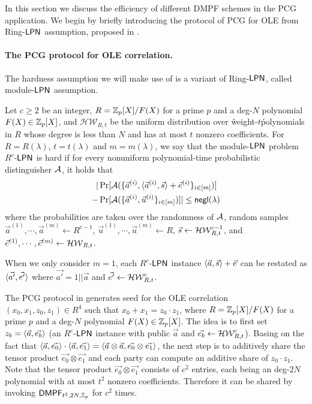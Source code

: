 In this section we discuss the efficiency of different DMPF schemes in the PCG application. We begin by briefly introducing the protocol of PCG for OLE from Ring-${\sf LPN}$ assumption, proposed in \cite{cryptoeprint:2022/1035}. 

\paragraph{The PCG protocol for OLE correlation.}The hardness assumption we will make use of is a variant of Ring-${\sf LPN}$, called module-${\sf LPN}$ assumption. 
\begin{definition}\label{def:module-LPN}
    Let $c\ge 2$ be an integer, $R = \mathbb{Z}_p[X]/F(X)$ for a prime $p$ and a deg-$N$ polynomial $F(X)\in \mathbb{Z}_p[X]$, and $\mathcal{HW}_{R,t}$ be the uniform distribution over \`weight-$t$\' polynomials in $R$ whose degree is less than $N$ and has at most $t$ nonzero coefficients. 
     For $R=R(\lambda)$, $t=t(\lambda)$ and $m=m(\lambda)$, we say that the module-${\sf LPN}$ problem $R^c$-${\sf LPN}$ is hard if for every nonuniform polynomial-time probabilistic distinguisher $\mathcal{A}$, it holds that 
    \begin{align*}
        |&\Pr[\mathcal{A}(\{\vec{a}^{(i)}, \langle \vec{a}^{(i)}, \vec{s} \rangle+\vec{e}^{(i)}\}_{i\in [m]})] \\
        -&\Pr[\mathcal{A}(\{\vec{a}^{(i)},\vec{u}^{(i)}\}_{i\in [m]})]| \le \mathsf{negl}(\lambda)
    \end{align*}
    where the probabilities are taken over the randomness of $\mathcal{A}$, random samples $\vec{a}^{(1)},\cdots, \vec{a}^{(m)}\leftarrow R^{c-1}$, $\vec{u}^{(1)},\cdots, \vec{u}^{(m)}\leftarrow R$, $\vec{s}\leftarrow \mathcal{HW}_{R,t}^{c-1}$, and $\vec{e}^{(1)},\cdots, \vec{e}^{(m)}\leftarrow \mathcal{HW}_{R,t}$. 

    When we only consider $m=1$, each $R^c$-${\sf LPN}$ instance $ \langle \vec{a}, \vec{s} \rangle+\vec{e}$ can be restated as $\langle \vec{a'}, \vec{e'} \rangle$ where $\vec{a'}=1||\vec{a}$ and $\vec{e'}\leftarrow \mathcal{HW}_{R,t}^c$. 
\end{definition}

The PCG protocol in \cite{cryptoeprint:2022/1035} generates seed for the OLE correlation $(x_0,x_1,z_0,z_1)\in R^4$ such that $x_0+x_1 = z_0\cdot z_1$, where $R = \mathbb{Z}_p[X]/F(X)$ for a prime $p$ and a deg-$N$ polynomial $F(X)\in \mathbb{Z}_p[X]$. The idea is to first set $z_b = \langle \vec{a}, \vec{e_b} \rangle$ (an $R^c$-${\sf LPN}$ instance with public $\vec{a}$ and $\vec{e_b}\leftarrow \mathcal{HW}_{R,t}^c$). Basing on the fact that $\langle \vec{a},  \vec{e_0} \rangle\cdot \langle \vec{a}, \vec{e_1} \rangle = \langle \vec{a}\otimes \vec{a}, \vec{e_0}\otimes \vec{e_1} \rangle$, the next step is to additively share the tensor product $\vec{e_0}\otimes \vec{e_1}$ and each party can compute an additive share of $z_0\cdot z_1$. Note that the tensor product $\vec{e_0}\otimes\vec{e_1}$ consists of $c^2$ entries, each being an deg-$2N$ polynomial with at most ${t}^2$ nonzero coefficients. Therefore it can be shared by invoking ${\sf DMPF}_{{t}^2, 2N, \mathbb{Z}_p}$ for $c^2$ times.

